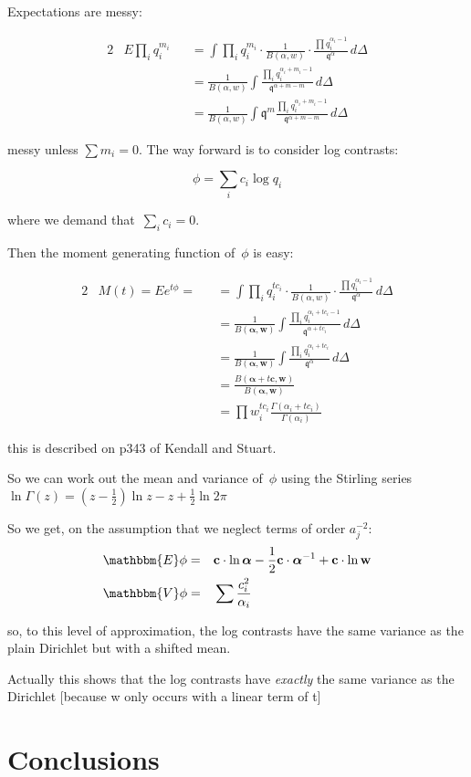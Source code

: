 \documentclass[nojss]{jss}
\newcommand{\ba}{\boldsymbol\alpha}
\newcommand{\bw}{\mathbf{w}}
\newcommand{\bc}{\mathbf{c}}
\begin{document}
Expectations are messy:

\begin{alignat}{2}
&  E \prod_i q_i^{m_i} && =  \int\prod_i{q_i^{m_i}}\cdot\frac{1}{B(\alpha,w)}\cdot\frac{\prod q_i^{\alpha_i-1}}{\mathfrak{q}^\alpha}\,d\Delta\\
    & && = \frac{1}{B(\alpha,w)}\int\frac{\prod_i q_i^{\alpha_i+m_i-1}}{\mathfrak{q}^{\alpha+m-m}}\,d\Delta\\
    & && = \frac{1}{B(\alpha,w)}\int\mathfrak{q}^m\frac{\prod_i q_i^{\alpha_i+m_i-1}}{\mathfrak{q}^{\alpha+m-m}}\,d\Delta
\end{alignat}

messy unless $\sum m_i=0$.  The way forward is to consider log contrasts:

\[\phi=\sum_i c_i\log q_i\]

where we demand that~$\sum_ic_i=0$.

Then the moment generating function of~$\phi$ is easy:

\begin{alignat}{2}
&  M(t) = Ee^{t\phi}= && =  \int\prod_i{q_i^{tc_i}}\cdot\frac{1}{B(\alpha,w)}\cdot\frac{\prod q_i^{\alpha_i-1}}{\mathfrak{q}^\alpha}\,d\Delta\\
    & && = \frac{1}{B(\ba,\bw)}\int\frac{\prod_i q_i^{\alpha_i+tc_i-1}}{\mathfrak{q}^{\alpha+tc_i}}\,d\Delta\\
    & && = \frac{1}{B(\ba,\bw)}\int\frac{\prod_i q_i^{\alpha_i+tc_i}}{\mathfrak{q}^{\alpha}}\,d\Delta\\
      & && = \frac{B(\ba+t\bc,\bw)}{B(\ba,\bw)}\\
      & && = \prod w_i^{tc_i}\frac{\Gamma(\alpha_i+tc_i)}{\Gamma(\alpha_i)}
\end{alignat}

this is described on p343 of Kendall and Stuart.

So we can work out the mean and variance of~$\phi$ using the Stirling
series~$\ln\Gamma(z)=\left(z-\frac{1}{2}\right)\ln z-z+\frac{1}{2}\ln
2\pi$

So we get, on the assumption that we neglect terms of order
$a_j^{-2}$:
\begin{alignat}{2}
&  \mathbbm{E}\phi =&& \bc\cdot\ln\ba - \frac{1}{2}\bc\cdot\ba^{-1} + \bc\cdot\ln\bw\\
& \mathbbm{V}\phi =&& \sum\frac{c_i^2}{\alpha_i}
  \end{alignat}


so, to this level of approximation, the log contrasts have the same
variance as the plain Dirichlet but with a shifted mean.

Actually this shows that the log contrasts have {\em exactly} the same
variance as the Dirichlet [because w only occurs with a linear term of
  t]







\section{Conclusions}




\end{document}
